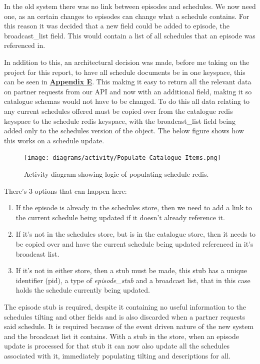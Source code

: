   \vspace{0.2cm}
  In the old system there was no link between episodes and schedules. We now need one, as an certain changes to episodes can change what a schedule 
  contains. For this reason it was decided that a new field could be added to episode, the broadcast\_list field. This would contain a list of all 
  schedules that an episode was referenced in.

  In addition to this, an architectural decision was made, before me taking on the project for this report, to have all schedule documents be in one keyspace,
  this can be seen in \hyperref[sec:AppendixE]{\textbf{Appendix E}}. 
  This making it easy to return all the relevant data on partner requests from our API and now with an additional field, making it so catalogue schemas would 
  not have to be changed. To do this all data relating to any current schedules offered must be copied over from the catalogue redis keyspace to the schedule
  redis keyspace, with the broadcast\_list field being added only to the schedules version of the object. The below figure shows how this works on a
  schedule update.

  \begin{figure}[H]
    \centering
    \texttt{[image: diagrams/activity/Populate Catalogue Items.png]}
    \caption{Activity diagram showing logic of populating schedule redis.}
    \label{fig:scheduleRedisPopulationActivity}
  \end{figure}

  There's 3 options that can happen here:
  \begin{enumerate}
    \item If the episode is already in the schedules store, then we need to add a link to the current schedule being updated if it doesn't
    already reference it. 
    \item If it's not in the schedules store, but is in the catalogue store, then it needs to be copied over and have the current schedule
    being updated referenced in it's broadcast list.
    \item If it's not in either store, then a stub must be made, this stub has a unique identifier (pid), a type of \emph{episode\_stub} and 
    a broadcast list, that in this case holds the schedule currently being updated.
  \end{enumerate}

  The episode stub is required, despite it containing no useful information to the schedules tilting and other fields and is also discarded when a
  partner requests said schedule. It is required because of the event driven nature of the new system and the broadcast list it contains. With a stub in 
  the store, when an episode update is processed for that stub it can now also update all the schedules associated with it, immediately populating tilting
  and descriptions for all.

